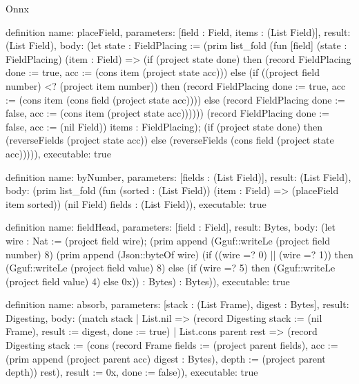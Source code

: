 \begin{lexlean}{Onnx}
\begin{semanticmodule}
definition{
  name: placeField,
  parameters: [field : Field, items : (List Field)],
  result: (List Field),
  body: (let state : FieldPlacing := (prim list_fold (fun [field] (state : FieldPlacing) (item : Field) => (if (project state done) then (record FieldPlacing {done := true, acc := (cons item (project state acc))}) else (if ((project field number) <? (project item number)) then (record FieldPlacing {done := true, acc := (cons item (cons field (project state acc)))}) else (record FieldPlacing {done := false, acc := (cons item (project state acc))})))) (record FieldPlacing {done := false, acc := (nil Field)}) items : FieldPlacing); (if (project state done) then (reverseFields (project state acc)) else (reverseFields (cons field (project state acc))))),
  executable: true
}

definition{
  name: byNumber,
  parameters: [fields : (List Field)],
  result: (List Field),
  body: (prim list_fold (fun (sorted : (List Field)) (item : Field) => (placeField item sorted)) (nil Field) fields : (List Field)),
  executable: true
}

definition{
  name: fieldHead,
  parameters: [field : Field],
  result: Bytes,
  body: (let wire : Nat := (project field wire); (prim append (Gguf::writeLe (project field number) 8) (prim append (Json::byteOf wire) (if ((wire =? 0) || (wire =? 1)) then (Gguf::writeLe (project field value) 8) else (if (wire =? 5) then (Gguf::writeLe (project field value) 4) else 0x)) : Bytes) : Bytes)),
  executable: true
}

definition{
  name: absorb,
  parameters: [stack : (List Frame), digest : Bytes],
  result: Digesting,
  body: (match stack
    | List.nil => (record Digesting {stack := (nil Frame), result := digest, done := true})
    | List.cons parent rest => (record Digesting {stack := (cons (record Frame {fields := (project parent fields), acc := (prim append (project parent acc) digest : Bytes), depth := (project parent depth)}) rest), result := 0x, done := false})),
  executable: true
}


\end{semanticmodule}
\end{lexlean}
